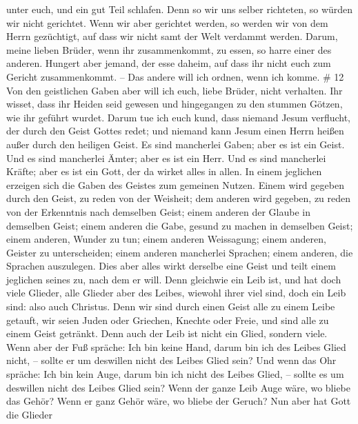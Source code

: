 unter euch, und ein gut Teil schlafen.  Denn so wir uns
selber richteten, so würden wir nicht gerichtet.  Wenn wir
aber gerichtet werden, so werden wir von dem Herrn gezüchtigt, auf dass
wir nicht samt der Welt verdammt werden.  Darum, meine
lieben Brüder, wenn ihr zusammenkommt, zu essen, so harre einer des
anderen.  Hungert aber jemand, der esse daheim, auf dass
ihr nicht euch zum Gericht zusammenkommt. -- Das andere will ich ordnen,
wenn ich komme. \# 12  Von den geistlichen Gaben aber will
ich euch, liebe Brüder, nicht verhalten.  Ihr wisset, dass
ihr Heiden seid gewesen und hingegangen zu den stummen Götzen, wie ihr
geführt wurdet.  Darum tue ich euch kund, dass niemand Jesum
verflucht, der durch den Geist Gottes redet; und niemand kann Jesum
einen Herrn heißen außer durch den heiligen Geist.  Es sind
mancherlei Gaben; aber es ist ein Geist.  Und es sind
mancherlei Ämter; aber es ist ein Herr.  Und es sind
mancherlei Kräfte; aber es ist ein Gott, der da wirket alles in allen.
 In einem jeglichen erzeigen sich die Gaben des Geistes zum
gemeinen Nutzen.  Einem wird gegeben durch den Geist, zu
reden von der Weisheit; dem anderen wird gegeben, zu reden von der
Erkenntnis nach demselben Geist;  einem anderen der Glaube
in demselben Geist; einem anderen die Gabe, gesund zu machen in
demselben Geist;  einem anderen, Wunder zu tun; einem
anderen Weissagung; einem anderen, Geister zu unterscheiden; einem
anderen mancherlei Sprachen; einem anderen, die Sprachen auszulegen.
 Dies aber alles wirkt derselbe eine Geist und teilt einem
jeglichen seines zu, nach dem er will.  Denn gleichwie ein
Leib ist, und hat doch viele Glieder, alle Glieder aber des Leibes,
wiewohl ihrer viel sind, doch ein Leib sind: also auch Christus.
 Denn wir sind durch einen Geist alle zu einem Leibe
getauft, wir seien Juden oder Griechen, Knechte oder Freie, und sind
alle zu einem Geist getränkt.  Denn auch der Leib ist nicht
ein Glied, sondern viele.  Wenn aber der Fuß spräche: Ich
bin keine Hand, darum bin ich des Leibes Glied nicht, -- sollte er um
deswillen nicht des Leibes Glied sein?  Und wenn das Ohr
spräche: Ich bin kein Auge, darum bin ich nicht des Leibes Glied, --
sollte es um deswillen nicht des Leibes Glied sein?  Wenn
der ganze Leib Auge wäre, wo bliebe das Gehör? Wenn er ganz Gehör wäre,
wo bliebe der Geruch?  Nun aber hat Gott die Glieder
